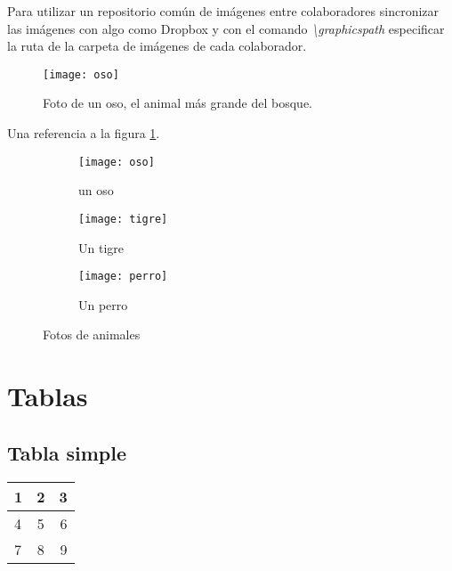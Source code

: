 \documentclass[12pt, a4paper,twoside]{article} %
\begin{document}
Para utilizar un repositorio común de imágenes entre colaboradores sincronizar las imágenes con algo como Dropbox y con el comando \emph{\textbackslash graphicspath} especificar la ruta de la carpeta de imágenes de cada colaborador.

\begin{figure}[!ht]
	\centering
		\texttt{[image: oso]}
		\caption[Foto de un oso.]{Foto de un oso, el 					animal más grande del bosque.}
		\label{fig:oso}
\end{figure}

Una referencia a la figura \ref{fig:oso}.

\begin{figure}
	\centering
	\begin{subfigure}[b]{0.3\textwidth}
		\centering
		\texttt{[image: oso]}
		\caption{un oso}
		\label{subfig:oso}
	\end{subfigure}
	\quad
	\begin{subfigure}[b]{0.3\textwidth}
		\centering
		\texttt{[image: tigre]}
		\caption{Un tigre}
		\label{subfig:tigre}
	\end{subfigure}
	\begin{subfigure}[b]{0.3\textwidth}
		\centering
		\texttt{[image: perro]}
		\caption{Un perro}
		\label{subfig:perro}
	\end{subfigure}
	\caption{Fotos de animales}\label{fig:animals}
\end{figure}

\section{Tablas}
\subsection{Tabla simple}
\begin{tabular}{| l | c | r |}
	\hline
  1 & 2 & 3 \\ \hline
  4 & 5 & 6 \\ \hline
  7 & 8 & 9 \\ \hline
\end{tabular}
\end{document}

